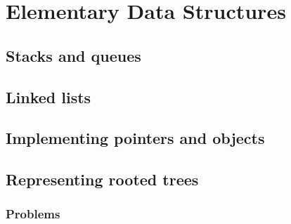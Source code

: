 \documentclass[fontsize=12pt,paper=a4,open=any]{book}
\begin{document}
\chapter{Elementary Data Structures}

\section{Stacks and queues}

\section{Linked lists}

\section{Implementing pointers and objects}

\section{Representing rooted trees}

\subsection*{Problems}
\end{document}
